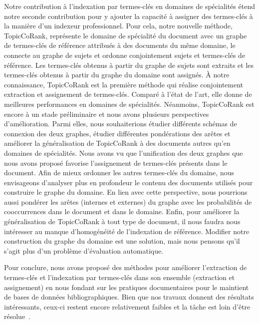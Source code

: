   Notre contribution à l'indexation par termes-clés en domaines de spécialités
  étend notre seconde contribution pour y ajouter la capacité à assigner des
  termes-clés à la manière d'un indexeur professionnel. Pour cela, notre
  nouvelle méthode, TopicCoRank, représente le domaine de spécialité du document
  avec un graphe de termes-clés de référence attribués à des documents du même
  domaine, le connecte au graphe de sujets et ordonne conjointement sujets et
  termes-clés de référence. Les termes-clés obtenus à partir du graphe de sujets
  sont extraits et les termes-clés obtenus à partir du graphe du domaine sont
  assignés. À notre connaissance, TopicCoRank est la première méthode qui
  réalise conjointement extraction et assignement de termes-clés. Comparé à
  l'état de l'art, elle donne de meilleures performances en domaines de
  spécialités. Néanmoins, TopicCoRank est encore à un stade préliminaire et nous
  avons plusieurs perspectives d'amélioration. Parmi elles, nous souhaiterions
  étudier différents schémas de connexion des deux graphes, étudier différentes
  pondérations des arêtes et améliorer la généralisation de TopicCoRank à des
  documents autres qu'en domaines de spécialités. Nous avons vu que
  l'unification des deux graphes que nous avons proposé favorise l'assignement
  de termes-clés présents dans le document. Afin de mieux ordonner les autres
  termes-clés du domaine, nous envisageons d'analyser plus en profondeur le
  contenu des documents utilisés pour construire le graphe du domaine. En lien
  avec cette perspective, nous pourrions aussi pondérer les arêtes (internes et
  externes) du graphe avec les probabilités de cooccurrences dans le document et
  dans le domaine. Enfin, pour améliorer la généralisation de TopicCoRank à tout
  type de document, il nous faudra nous intéresser au manque d'homogénéité de
  l'indexation de référence. Modifier notre construction du graphe du domaine
  est une solution, mais nous pensons qu'il s'agit plus d'un problème
  d'évaluation automatique.

  Pour conclure, nous avons proposé des méthodes pour améliorer l'extraction de
  termes-clés et l'indexation par termes-clés dans son ensemble (extraction et
  assignement) en nous fondant sur les pratiques documentaires pour le maintient
  de bases de données bibliographiques. Bien que nos travaux donnent des
  résultats intéressants, ceux-ci restent encore relativement faibles et \og{}la
  tâche est loin d'être résolue\fg{}~\cite{hasan2014state_of_the_art}.

